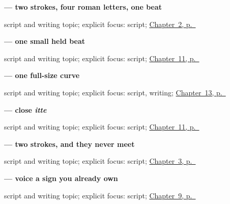 \noindent\begin{minipage}[t]{\linewidth}
\raggedright
\textbf{ — two strokes, four roman letters, one beat}\par
\footnotesize script and writing topic; explicit focus: script; \hyperref[ch:ja-daytime-greeting]{Chapter~2, p.~\pageref*{ch:ja-daytime-greeting}}
\end{minipage}\par\smallskip

\noindent\begin{minipage}[t]{\linewidth}
\raggedright
\textbf{ — one small held beat}\par
\footnotesize script and writing topic; explicit focus: script; \hyperref[ch:ja-body-seven]{Chapter~11, p.~\pageref*{ch:ja-body-seven}}
\end{minipage}\par\smallskip

\noindent\begin{minipage}[t]{\linewidth}
\raggedright
\textbf{ — one full-size curve}\par
\footnotesize script and writing topic; explicit focus: script, writing; \hyperref[ch:ja-family-nine]{Chapter~13, p.~\pageref*{ch:ja-family-nine}}
\end{minipage}\par\smallskip

\noindent\begin{minipage}[t]{\linewidth}
\raggedright
\textbf{ — close \emph{itte}}\par
\footnotesize script and writing topic; explicit focus: script; \hyperref[ch:ja-body-seven]{Chapter~11, p.~\pageref*{ch:ja-body-seven}}
\end{minipage}\par\smallskip

\noindent\begin{minipage}[t]{\linewidth}
\raggedright
\textbf{ — two strokes, and they never meet}\par
\footnotesize script and writing topic; explicit focus: script; \hyperref[ch:ja-plain-thanks]{Chapter~3, p.~\pageref*{ch:ja-plain-thanks}}
\end{minipage}\par\smallskip

\noindent\begin{minipage}[t]{\linewidth}
\raggedright
\textbf{ — voice a sign you already own}\par
\footnotesize script and writing topic; explicit focus: script; \hyperref[ch:ja-repeat-please]{Chapter~9, p.~\pageref*{ch:ja-repeat-please}}
\end{minipage}\par\smallskip

